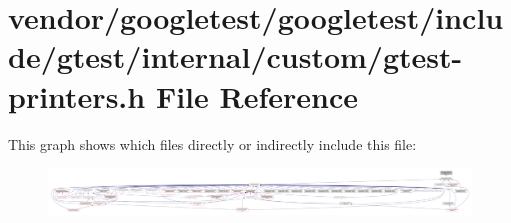 \hypertarget{internal_2custom_2gtest-printers_8h}{}\section{vendor/googletest/googletest/include/gtest/internal/custom/gtest-\/printers.h File Reference}
\label{internal_2custom_2gtest-printers_8h}
This graph shows which files directly or indirectly include this file\+:\nopagebreak
\begin{figure}[H]
\begin{center}
\leavevmode
\includegraphics[width=350pt]{internal_2custom_2gtest-printers_8h__dep__incl}
\end{center}
\end{figure}

